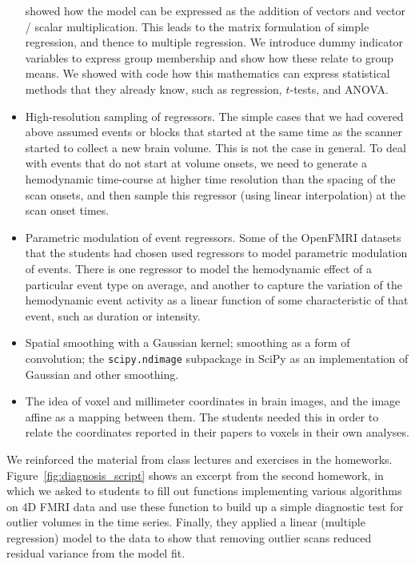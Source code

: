 \begin{itemize}
        showed how the model can be expressed as the addition of vectors and
        vector / scalar multiplication.  This leads to the matrix formulation
        of simple regression, and thence to multiple regression.  We introduce
        dummy indicator variables to express group membership and show how
        these relate to group means.  We showed with code how this mathematics
        can express statistical methods that they already know, such as
        regression, $t$-tests, and ANOVA.
\item
    High-resolution sampling of regressors.  The simple cases that we had
        covered above assumed events or blocks that started at the same time
        as the scanner started to collect a new brain volume.  This is not the
        case in general.  To deal with events that do not start at volume
        onsets, we need to generate a hemodynamic time-course at higher
        time resolution than the spacing of the scan onsets, and then sample
        this regressor (using linear interpolation) at the scan onset times.
\item
    Parametric modulation of event regressors.  Some of the OpenFMRI datasets
        that the students had chosen used regressors to model parametric
        modulation of events.  There is one regressor to model the hemodynamic
        effect of a particular event type on average, and another to capture
        the variation of the hemodynamic event activity as a linear function
        of some characteristic of that event, such as duration or intensity.
\item
    Spatial smoothing with a Gaussian kernel; smoothing as a form of
    convolution; the \texttt{scipy.ndimage} subpackage in SciPy as an
    implementation of Gaussian and other smoothing.

\item
    The idea of voxel and millimeter coordinates in brain images, and the
    image affine as a mapping between them.  The students needed this in order
    to relate the coordinates reported in their papers to voxels in their own
    analyses.

\end{itemize}

We reinforced the material from class lectures and exercises in the homeworks.
Figure~\ref{fig:diagnosis_script} shows an excerpt from the second homework,
in which we asked to students to fill out functions implementing various
algorithms on 4D FMRI data and use these function to build up a simple
diagnostic test for outlier volumes in the time series.  Finally, they
applied a linear (multiple regression) model to the data to show that removing
outlier scans reduced residual variance from the model fit.

